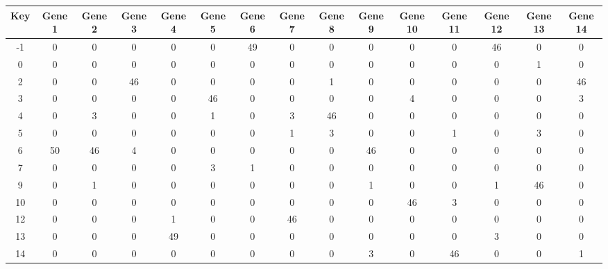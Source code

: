 \begin{tabular}{|c|c|c|c|c|c|c|c|c|c|c|c|c|c|c|}
\hline
Key & Gene 1 & Gene 2 & Gene 3 & Gene 4 & Gene 5 & Gene 6 & Gene 7 & Gene 8 & Gene 9 & Gene 10 & Gene 11 & Gene 12 & Gene 13 & Gene 14 \\
\hline
-1 & 0 & 0 & 0 & 0 & 0 & 49 & 0 & 0 & 0 & 0 & 0 & 46 & 0 & 0 \\
0 & 0 & 0 & 0 & 0 & 0 & 0 & 0 & 0 & 0 & 0 & 0 & 0 & 1 & 0 \\
2 & 0 & 0 & 46 & 0 & 0 & 0 & 0 & 1 & 0 & 0 & 0 & 0 & 0 & 46 \\
3 & 0 & 0 & 0 & 0 & 46 & 0 & 0 & 0 & 0 & 4 & 0 & 0 & 0 & 3 \\
4 & 0 & 3 & 0 & 0 & 1 & 0 & 3 & 46 & 0 & 0 & 0 & 0 & 0 & 0 \\
5 & 0 & 0 & 0 & 0 & 0 & 0 & 1 & 3 & 0 & 0 & 1 & 0 & 3 & 0 \\
6 & 50 & 46 & 4 & 0 & 0 & 0 & 0 & 0 & 46 & 0 & 0 & 0 & 0 & 0 \\
7 & 0 & 0 & 0 & 0 & 3 & 1 & 0 & 0 & 0 & 0 & 0 & 0 & 0 & 0 \\
9 & 0 & 1 & 0 & 0 & 0 & 0 & 0 & 0 & 1 & 0 & 0 & 1 & 46 & 0 \\
10 & 0 & 0 & 0 & 0 & 0 & 0 & 0 & 0 & 0 & 46 & 3 & 0 & 0 & 0 \\
12 & 0 & 0 & 0 & 1 & 0 & 0 & 46 & 0 & 0 & 0 & 0 & 0 & 0 & 0 \\
13 & 0 & 0 & 0 & 49 & 0 & 0 & 0 & 0 & 0 & 0 & 0 & 3 & 0 & 0 \\
14 & 0 & 0 & 0 & 0 & 0 & 0 & 0 & 0 & 3 & 0 & 46 & 0 & 0 & 1 \\
\hline
\end{tabular}